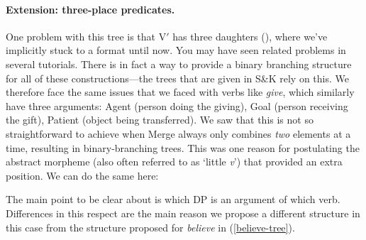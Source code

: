 \documentclass{article}
\begin{document}
\paragraph{Extension: three-place predicates.} One problem with this tree is that V$'$ has three daughters (), where we've implicitly stuck to a  format until now.
You may have seen related problems in several tutorials.
There is in fact a way to provide a binary branching structure for all of these constructions---the trees that are given in S\&K rely on this.
We therefore face the same issues that we faced with  verbs like \emph{give}, which similarly have three arguments: Agent (person doing the giving), Goal (person receiving the gift), Patient (object being transferred).
We saw that this is not so straightforward to achieve when Merge always only combines \textit{two} elements at a time, resulting in binary-branching trees.
This was one reason for postulating the abstract  morpheme (also often referred to as `little \emph{v}') that provided an extra position. We can do the same here:
\begin{exe}
\end{exe}
The main point to be clear about is which DP is an argument of which verb.
Differences in this respect are the main reason we propose a different structure in this case from the structure proposed for \emph{believe} in (\ref{believe-tree}).
\end{document}
